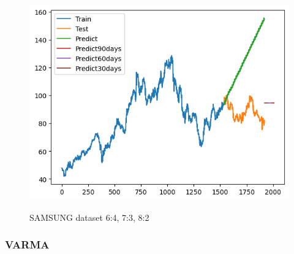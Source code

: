 \documentclass[conference]{IEEEtran}
\begin{document}
\begin{figure}[H]
\begin{minipage}{0.15\textwidth}
    \label{fig:2}
    \end{minipage}%
    \begin{minipage}{0.15\textwidth}
    \centering
    \includegraphics[width=1\textwidth]{Image/ARIMA/SONY_8_2_Arima.png}

    \label{fig:3}
    \end{minipage}
    \caption{SAMSUNG dataset 6:4, 7:3, 8:2 }
\end{figure}

\subsubsection{VARMA}
\end{document}
